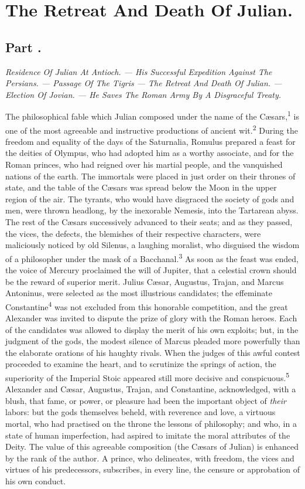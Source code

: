 \chapter{The Retreat And Death Of Julian.}
\section{Part \thesection.}

\textit{Residence Of Julian At Antioch. — His Successful Expedition Against
The Persians. — Passage Of The Tigris — The Retreat And Death Of
Julian. — Election Of Jovian. — He Saves The Roman Army By A
Disgraceful Treaty.}
\vspace{\onelineskip}

The philosophical fable which Julian composed under the name of
the Cæsars,\textsuperscript{1} is one of the most agreeable and instructive
productions of ancient wit.\textsuperscript{2} During the freedom and equality of
the days of the Saturnalia, Romulus prepared a feast for the
deities of Olympus, who had adopted him as a worthy associate,
and for the Roman princes, who had reigned over his martial
people, and the vanquished nations of the earth. The immortals
were placed in just order on their thrones of state, and the
table of the Cæsars was spread below the Moon in the upper region
of the air. The tyrants, who would have disgraced the society of
gods and men, were thrown headlong, by the inexorable Nemesis,
into the Tartarean abyss. The rest of the Cæsars successively
advanced to their seats; and as they passed, the vices, the
defects, the blemishes of their respective characters, were
maliciously noticed by old Silenus, a laughing moralist, who
disguised the wisdom of a philosopher under the mask of a
Bacchanal.\textsuperscript{3} As soon as the feast was ended, the voice of Mercury
proclaimed the will of Jupiter, that a celestial crown should be
the reward of superior merit. Julius Cæsar, Augustus, Trajan, and
Marcus Antoninus, were selected as the most illustrious
candidates; the effeminate Constantine\textsuperscript{4} was not excluded from
this honorable competition, and the great Alexander was invited
to dispute the prize of glory with the Roman heroes. Each of the
candidates was allowed to display the merit of his own exploits;
but, in the judgment of the gods, the modest silence of Marcus
pleaded more powerfully than the elaborate orations of his
haughty rivals. When the judges of this awful contest proceeded
to examine the heart, and to scrutinize the springs of action,
the superiority of the Imperial Stoic appeared still more
decisive and conspicuous.\textsuperscript{5} Alexander and Cæsar, Augustus,
Trajan, and Constantine, acknowledged, with a blush, that fame,
or power, or pleasure had been the important object of \textit{their}
labors: but the gods themselves beheld, with reverence and love,
a virtuous mortal, who had practised on the throne the lessons of
philosophy; and who, in a state of human imperfection, had
aspired to imitate the moral attributes of the Deity. The value
of this agreeable composition (the Cæsars of Julian) is enhanced
by the rank of the author. A prince, who delineates, with
freedom, the vices and virtues of his predecessors, subscribes,
in every line, the censure or approbation of his own conduct.

